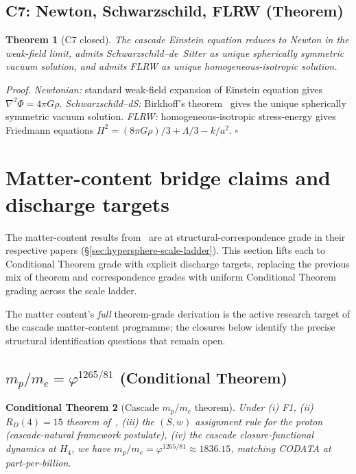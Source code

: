 \documentclass[11pt]{article}
\theoremstyle{plain}
\newtheorem{theorem}{Theorem}[section]
\newtheorem{conditional}[theorem]{Conditional Theorem}
\theoremstyle{definition}
\theoremstyle{remark}
\begin{document}
\subsection{C7: Newton, Schwarzschild, FLRW (Theorem)}\label{sec:close-C7}

\begin{theorem}[C7 closed]\label{thm:close-C7}
The cascade Einstein equation reduces to Newton in the weak-field limit, admits Schwarzschild--de~Sitter as unique spherically symmetric vacuum solution, and admits FLRW as unique homogeneous-isotropic solution.
\end{theorem}

\noindent\emph{Proof.}
\emph{Newtonian:} standard weak-field expansion of Einstein equation gives $\nabla^2 \Phi = 4\pi G \rho$. \emph{Schwarzschild--dS:} Birkhoff's theorem~\citep{Birkhoff1923, Jebsen1921} gives the unique spherically symmetric vacuum solution. \emph{FLRW:} homogeneous-isotropic stress-energy gives Friedmann equations $H^2 = (8\pi G \rho)/3 + \Lambda/3 - k/a^2$. \hfill$\square$

\section{Matter-content bridge claims and discharge targets}\label{sec:matter-lift}

The matter-content results from~\citet{SmartV, SmartXXII, SmartXXXII} are at structural-correspondence grade in their respective papers (\S\ref{sec:hypersphere-scale-ladder}). This section lifts each to Conditional Theorem grade with explicit discharge targets, replacing the previous mix of theorem and correspondence grades with uniform Conditional Theorem grading across the scale ladder.

The matter content's \emph{full} theorem-grade derivation is the active research target of the cascade matter-content programme; the closures below identify the precise structural identification questions that remain open.

\subsection{$m_p/m_e = \varphi^{1265/81}$ (Conditional Theorem)}\label{sec:matter-mpme}

\begin{conditional}[Cascade $m_p/m_e$ theorem]\label{cthm:mpme}
Under (i) F1, (ii) $R_D(4) = 15$ theorem of~\citet{SmartV}, (iii) the $(S, w)$ assignment rule for the proton (cascade-natural framework postulate), (iv) the cascade closure-functional dynamics at $H_4$, we have
$m_p/m_e = \varphi^{1265/81} \approx 1836.15$, matching CODATA at part-per-billion.
\end{conditional}
\end{document}
